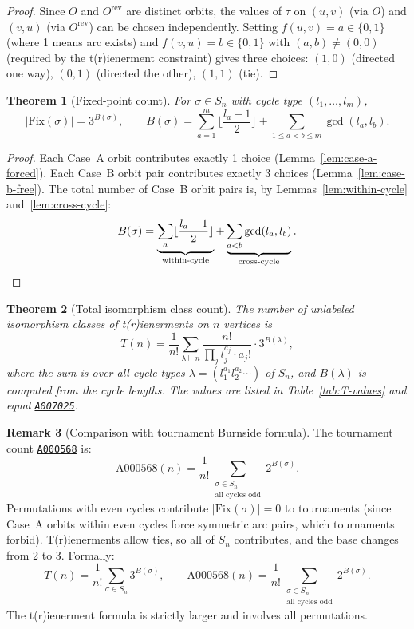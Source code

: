 \documentclass[12pt,reqno]{amsart}
\newtheorem{theorem}{Theorem}[section]
\theoremstyle{definition}
\newtheorem{remark}[theorem]{Remark}
\theoremstyle{plain}
\newcommand{\Fix}{\mathrm{Fix}}
\newcommand{\floor}[1]{\lfloor #1 \rfloor}
\newcommand{\OEIS}[1]{\href{https://oeis.org/#1}{\texttt{#1}}}
\begin{document}
\begin{proof}
Since $O$ and $O^{\mathrm{rev}}$ are distinct orbits, the values of $\tau$ on
$(u,v)$ (via $O$) and $(v,u)$ (via $O^{\mathrm{rev}}$) can be chosen independently.
Setting $f(u,v)=a\in\{0,1\}$ (where 1 means arc exists) and $f(v,u)=b\in\{0,1\}$
with $(a,b)\ne(0,0)$ (required by the t(r)ienerment constraint) gives three choices:
$(1,0)$ (directed one way), $(0,1)$ (directed the other), $(1,1)$ (tie).
\end{proof}

\begin{theorem}[Fixed-point count]\label{thm:fix}
For $\sigma\in S_n$ with cycle type $(l_1,\ldots,l_m)$,
\[
  |\Fix(\sigma)| = 3^{B(\sigma)},
  \qquad
  B(\sigma)=\sum_{a=1}^m\floor{\frac{l_a-1}{2}}+\sum_{1\le a<b\le m}\gcd(l_a,l_b).
\]
\end{theorem}

\begin{proof}
Each Case~A orbit contributes exactly 1 choice (Lemma~\ref{lem:case-a-forced}).
Each Case~B orbit pair contributes exactly 3 choices (Lemma~\ref{lem:case-b-free}).
The total number of Case~B orbit pairs is, by Lemmas~\ref{lem:within-cycle}
and~\ref{lem:cross-cycle}:
\[
  B(\sigma)
  =\underbrace{\sum_a\floor{\frac{l_a-1}{2}}}_{\text{within-cycle}}
  +\underbrace{\sum_{a<b}\gcd(l_a,l_b)}_{\text{cross-cycle}}.
  \qedhere
\]
\end{proof}

\begin{theorem}[Total isomorphism class count]\label{thm:total-count}
The number of unlabeled isomorphism classes of t(r)ienerments on $n$ vertices is
\[
  T(n)=\frac{1}{n!}\sum_{\lambda\vdash n}
  \frac{n!}{\prod_j l_j^{a_j}\cdot a_j!}\cdot 3^{B(\lambda)},
\]
where the sum is over all cycle types $\lambda=(l_1^{a_1}l_2^{a_2}\cdots)$ of $S_n$,
and $B(\lambda)$ is computed from the cycle lengths.  The values are listed in
Table~\ref{tab:T-values} and equal \OEIS{A007025}.
\end{theorem}

\begin{remark}[Comparison with tournament Burnside formula]
The tournament count \OEIS{A000568} is:
\[
  \text{A000568}(n)=\frac{1}{n!}\sum_{\substack{\sigma\in S_n\\\text{all cycles odd}}}2^{B(\sigma)}.
\]
Permutations with even cycles contribute $|\Fix(\sigma)|=0$ to tournaments (since Case~A
orbits within even cycles force symmetric arc pairs, which tournaments forbid).
T(r)ienerments allow ties, so all of $S_n$ contributes, and the base changes from 2 to 3.
Formally:
\[
  T(n)=\frac{1}{n!}\sum_{\sigma\in S_n}3^{B(\sigma)},
  \qquad
  \text{A000568}(n)=\frac{1}{n!}\sum_{\substack{\sigma\in S_n\\\text{all cycles odd}}}2^{B(\sigma)}.
\]
The t(r)ienerment formula is strictly larger and involves all permutations.
\end{remark}
\end{document}
